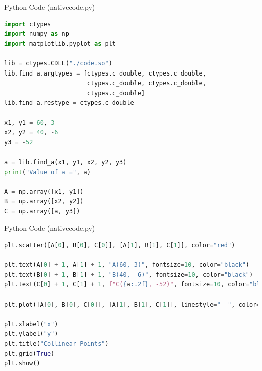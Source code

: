\documentclass{beamer}
\begin{document}
\begin{frame}[fragile]{Python Code (nativecode.py)}
\begin{lstlisting}[language=Python]
import ctypes
import numpy as np
import matplotlib.pyplot as plt

lib = ctypes.CDLL("./code.so")
lib.find_a.argtypes = [ctypes.c_double, ctypes.c_double,
                       ctypes.c_double, ctypes.c_double,
                       ctypes.c_double]
lib.find_a.restype = ctypes.c_double

x1, y1 = 60, 3
x2, y2 = 40, -6
y3 = -52

a = lib.find_a(x1, y1, x2, y2, y3)
print("Value of a =", a)

A = np.array([x1, y1])
B = np.array([x2, y2])
C = np.array([a, y3])
\end{lstlisting}
\end{frame}
\begin{frame}[fragile]{Python Code (nativecode.py)}
\begin{lstlisting}[language=Python]
plt.scatter([A[0], B[0], C[0]], [A[1], B[1], C[1]], color="red")

plt.text(A[0] + 1, A[1] + 1, "A(60, 3)", fontsize=10, color="black")
plt.text(B[0] + 1, B[1] + 1, "B(40, -6)", fontsize=10, color="black")
plt.text(C[0] + 1, C[1] + 1, f"C({a:.2f}, -52)", fontsize=10, color="black")

plt.plot([A[0], B[0], C[0]], [A[1], B[1], C[1]], linestyle="--", color="blue")

plt.xlabel("x")
plt.ylabel("y")
plt.title("Collinear Points")
plt.grid(True)
plt.show()
\end{lstlisting}
\end{frame}
\end{document}

